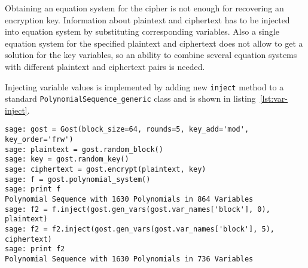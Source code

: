 Obtaining an equation system for the cipher is not enough for recovering an
encryption key. Information about plaintext and ciphertext has to be injected
into equation system by substituting corresponding variables. Also a single
equation system for the specified plaintext and ciphertext does not allow to get a
solution for the key variables, so an ability to combine several equation
systems with different plaintext and ciphertext pairs is needed.

Injecting variable values is implemented by adding new \verb+inject+ method to
a standard \verb+PolynomialSequence_generic+ class and is shown in
listing~\ref{lst:var-inject}.

\begin{lstlisting}[label=lst:var-inject, caption=Injecting variable values into equation system]
sage: gost = Gost(block_size=64, rounds=5, key_add='mod', key_order='frw')
sage: plaintext = gost.random_block()
sage: key = gost.random_key()
sage: ciphertext = gost.encrypt(plaintext, key)
sage: f = gost.polynomial_system()
sage: print f
Polynomial Sequence with 1630 Polynomials in 864 Variables
sage: f2 = f.inject(gost.gen_vars(gost.var_names['block'], 0), plaintext)
sage: f2 = f2.inject(gost.gen_vars(gost.var_names['block'], 5), ciphertext)
sage: print f2
Polynomial Sequence with 1630 Polynomials in 736 Variables
\end{lstlisting}

